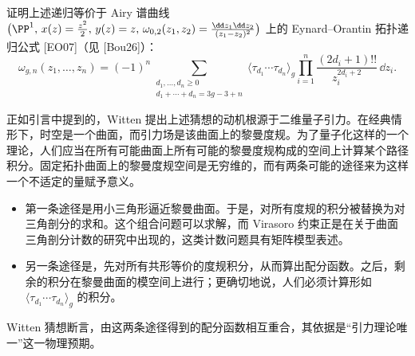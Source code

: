 \begin{exercise}[2.11]
证明上述递归等价于 Airy 谱曲线 $\bigl(\PP^1,\,x(z)=\frac{z^2}{2},\,y(z)=z,\,\omega_{0,2}(z_1,z_2)=\frac{\dd z_1\dd z_2}{(z_1-z_2)^2}\bigr)$ 上的 Eynard--Orantin 拓扑递归公式 [EO07]（见 [Bou26]）：
\begin{equation}
\omega_{g,n}(z_1,\ldots,z_n)=(-1)^n\sum_{\substack{d_1,\ldots,d_n\ge0\\ d_1+\cdots+d_n=3g-3+n}}\langle\tau_{d_1}\cdots\tau_{d_n}\rangle_g\prod_{i=1}^{n}\frac{(2d_i+1)!!}{z_i^{2d_i+2}}\,\dd z_i. \tag{2.71}
\end{equation}
\end{exercise}

正如引言中提到的，Witten 提出上述猜想的动机根源于二维量子引力。在经典情形下，时空是一个曲面，而引力场是该曲面上的黎曼度规。为了量子化这样的一个理论，人们应当在所有可能曲面上所有可能的黎曼度规构成的空间上计算某个路径积分。固定拓扑曲面上的黎曼度规空间是无穷维的，而有两条可能的途径来为这样一个不适定的量赋予意义。
\begin{itemize}
\item 第一条途径是用小三角形逼近黎曼曲面。于是，对所有度规的积分被替换为对三角剖分的求和。这个组合问题可以求解，而 Virasoro 约束正是在关于曲面三角剖分计数的研究中出现的，这类计数问题具有矩阵模型表述。
\item 另一条途径是，先对所有共形等价的度规积分，从而算出配分函数。之后，剩余的积分在黎曼曲面的模空间上进行；更确切地说，人们必须计算形如 $\langle\tau_{d_1}\cdots\tau_{d_n}\rangle_g$ 的积分。
\end{itemize}

Witten 猜想断言，由这两条途径得到的配分函数相互重合，其依据是“引力理论唯一”这一物理预期。

